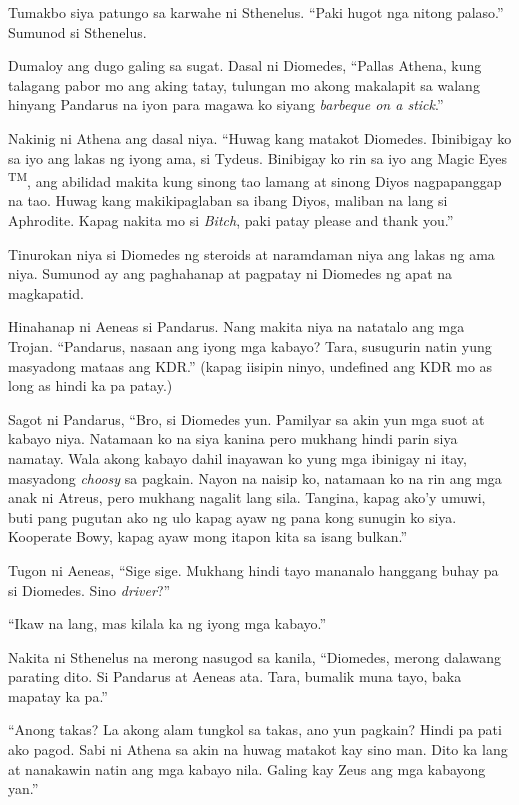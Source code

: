 \documentclass[12pt,letterpaper]{report}
\begin{document}
Tumakbo siya patungo sa karwahe ni Sthenelus. ``Paki hugot nga nitong palaso.'' Sumunod si Sthenelus.

Dumaloy ang dugo galing sa sugat. Dasal ni Diomedes, ``Pallas Athena, kung talagang pabor mo ang aking tatay, tulungan mo akong makalapit sa walang hinyang Pandarus na iyon para magawa ko siyang \textit{barbeque on a stick}.''

Nakinig ni Athena ang dasal niya. ``Huwag kang matakot Diomedes. Ibinibigay ko sa iyo ang lakas ng iyong ama, si Tydeus. Binibigay ko rin sa iyo ang Magic Eyes \textsuperscript{TM}, ang abilidad makita kung sinong tao lamang at sinong Diyos nagpapanggap na tao. Huwag kang makikipaglaban sa ibang Diyos, maliban na lang si Aphrodite. Kapag nakita mo si \textit{Bitch}, paki patay please and thank you.''

Tinurokan niya si Diomedes ng steroids at naramdaman niya ang lakas ng ama niya. Sumunod ay ang paghahanap at pagpatay ni Diomedes ng apat na magkapatid.

Hinahanap ni Aeneas si Pandarus. Nang makita niya na natatalo ang mga Trojan. ``Pandarus, nasaan ang iyong mga kabayo? Tara, susugurin natin yung masyadong mataas ang KDR.'' (kapag iisipin ninyo, undefined ang KDR mo as long as hindi ka pa patay.)

Sagot ni Pandarus, ``Bro, si Diomedes yun. Pamilyar sa akin yun mga suot at kabayo niya. Natamaan ko na siya kanina pero mukhang hindi parin siya namatay. Wala akong kabayo dahil inayawan ko yung mga ibinigay ni itay, masyadong \textit{choosy} sa pagkain. Nayon na naisip ko, natamaan ko na rin ang mga anak ni Atreus, pero mukhang nagalit lang sila. Tangina, kapag ako'y umuwi, buti pang pugutan ako ng ulo kapag ayaw ng pana kong sunugin ko siya. Kooperate Bowy, kapag ayaw mong itapon kita sa isang bulkan.''

Tugon ni Aeneas, ``Sige sige. Mukhang hindi tayo mananalo hanggang buhay pa si Diomedes. Sino \textit{driver}?''

``Ikaw na lang, mas kilala ka ng iyong mga kabayo.''

Nakita ni Sthenelus na merong nasugod sa kanila, ``Diomedes, merong dalawang parating dito. Si Pandarus at Aeneas ata. Tara, bumalik muna tayo, baka mapatay ka pa.''

``Anong takas? La akong alam tungkol sa takas, ano yun pagkain? Hindi pa pati ako pagod. Sabi ni Athena sa akin na huwag matakot kay sino man. Dito ka lang at nanakawin natin ang mga kabayo nila. Galing kay Zeus ang mga kabayong yan.''
\end{document}
